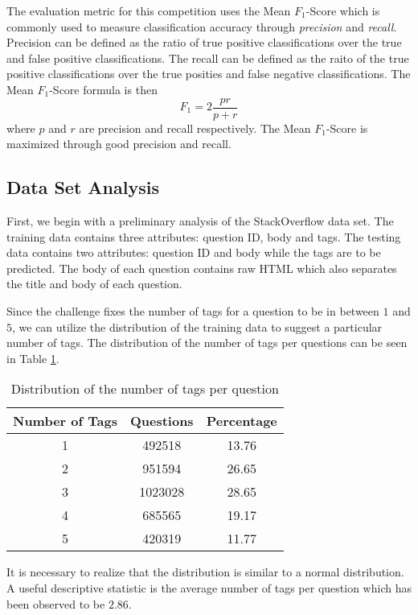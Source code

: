\documentclass{sig-alternate}
\newcommand{\Fone}{$F_1$}
\begin{document}
	The evaluation metric for this competition uses the Mean \Fone-Score
	which is commonly used to measure classification accuracy through
	\emph{precision} and \emph{recall}. Precision can be defined as the
	ratio of true positive classifications over the true and false
	positive classifications. The recall can be defined as the raito of
	the true positive classifications over the true posities and false
	negative classifications. The Mean \Fone-Score formula is then
	\[
		F_1 = 2\frac{pr}{p + r}
	\]
	where $p$ and $r$ are precision and recall respectively. The Mean
	\Fone-Score is maximized through good precision and recall.

	\subsection{Data Set Analysis} %
	\label{sub:Data Set Analysis}
		First, we begin with a preliminary analysis of the StackOverflow data
		set. The training data contains three attributes: question ID, body and
		tags. The testing data contains two attributes: question ID and body
		while the tags are to be predicted. The body of each question contains
		raw HTML which also separates the title and body of each question.
		
		Since the challenge fixes the number of tags for a question to be
		in between $1$ and $5$, we can utilize the distribution of the training
		data to suggest a particular number of tags. The distribution of the
		number of tags per questions can be seen in Table \ref{tab:tag_dist}.
		\begin{table}[htp]
		\centering
		\begin{tabular}{|c|c|c|}
			\hline
			\textbf{Number of Tags} & \textbf{Questions} & \textbf{Percentage} \\\hline
			1	& 492518	& 13.76	\\\hline
			2	& 951594	& 26.65	\\\hline
			3	& 1023028	& 28.65	\\\hline
			4	& 685565	& 19.17	\\\hline
			5	& 420319	& 11.77	\\\hline
		\end{tabular}
		\label{tab:tag_dist}
		\caption{Distribution of the number of tags per question}
		\end{table}
		It is necessary to realize that the distribution is similar to a
		normal distribution. A useful descriptive statistic is the average
		number of tags per question which has been observed to be $2.86$.
\end{document}
